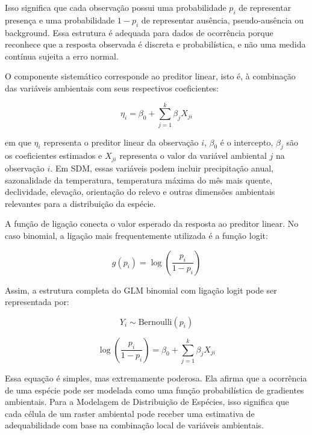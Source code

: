 \noindent Isso significa que cada observação possui uma probabilidade $p_i$ de representar presença e uma probabilidade $1-p_i$ de representar ausência, pseudo-ausência ou background. Essa estrutura é adequada para dados de ocorrência porque reconhece que a resposta observada é discreta e probabilística, e não uma medida contínua sujeita a erro normal.

O componente sistemático corresponde ao preditor linear, isto é, à combinação das variáveis ambientais com seus respectivos coeficientes:

\begin{equation}
	\eta_i =
	\beta_0 +
	\sum_{j=1}^{k}\beta_jX_{ji}
\end{equation}

\noindent em que $\eta_i$ representa o preditor linear da observação $i$, $\beta_0$ é o intercepto, $\beta_j$ são os coeficientes estimados e $X_{ji}$ representa o valor da variável ambiental $j$ na observação $i$. Em SDM, essas variáveis podem incluir precipitação anual, sazonalidade da temperatura, temperatura máxima do mês mais quente, declividade, elevação, orientação do relevo e outras dimensões ambientais relevantes para a distribuição da espécie.

A função de ligação conecta o valor esperado da resposta ao preditor linear. No caso binomial, a ligação mais frequentemente utilizada é a função logit:

\begin{equation}
	g(p_i) =
	\log\left(\frac{p_i}{1-p_i}\right)
\end{equation}

Assim, a estrutura completa do GLM binomial com ligação logit pode ser representada por:

\begin{equation}
	Y_i \sim \text{Bernoulli}(p_i)
\end{equation}

\begin{equation}
	\log\left(\frac{p_i}{1-p_i}\right)
	=
	\beta_0 +
	\sum_{j=1}^{k}\beta_jX_{ji}
\end{equation}

Essa equação é simples, mas extremamente poderosa. Ela afirma que a ocorrência de uma espécie pode ser modelada como uma função probabilística de gradientes ambientais. Para a Modelagem de Distribuição de Espécies, isso significa que cada célula de um raster ambiental pode receber uma estimativa de adequabilidade com base na combinação local de variáveis ambientais.

